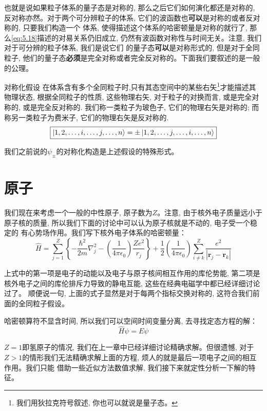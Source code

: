 \documentclass[a4paper,zihao=-4,linespread=1]{ctexrep}
\begin{document}
    也就是说如果粒子体系的量子态是对称的, 那么之后它们如何演化都还是对称的, 反对称亦然。对于两个可分辨粒子的体系, 它们的波函数也\textbf{可以}是对称的或者反对称的, 只要我们构造一个
    体系, 使得描述这个体系的哈密顿量是对称的就行了, 那么\ref{eq:5.18}描述的对易关系仍旧成立, 仍然有波函数对称性与时间无关。注意, 我们对于可分辨的粒子体系, 我们是说它们
    的量子态\textbf{可以}是对称形式的, 但是对于全同粒子, 他们的量子态\textbf{必须}是完全对称或者完全反对称的。下面我们要叙述的是一般的公理。
    \begin{proposition}{对称化假设}
        在体系含有多个全同粒子时,只有其态空间中的某些右矢\footnote{我们用狄拉克符号叙述, 你也可以就说是量子态。}才能描述其物理状态, 根据全同粒子的性质, 这些物理右矢, 对于粒子的对换而言, 或是完全对称的, 或是完全反对称的. 我们称一类粒子为玻色子, 它们的物理右矢是对称的; 而称另一类粒子为费米子, 它们的物理右矢是反对称的.
        \begin{equation}
            \boxed{
                \ket{1,2,\ldots,i,\ldots,j,\ldots,n}=\pm\ket{1,2,\ldots,j,\ldots,i,\ldots,n}
            }
        \end{equation}
    \end{proposition}
    我们之前说的$\psi_\pm$的对称化构造是上述假设的特殊形式。

    \section{原子}
    我们现在来考虑一个一般的中性原子, 原子数为$Z$。注意, 由于核外电子质量远小于原子核的质量, 所以我们下面的讨论中可以认为原子核就是不动的, 电子受一个稳定的
    有心势场作用。我们写下核外电子体系的哈密顿量：
    \begin{equation}
        \hat{H}=\sum_{j=1}^{Z}\left\{-\frac{\hbar^{2}}{2 m} \nabla_{j}^{2}-\left(\frac{1}{4 \pi \epsilon_{0}}\right) \frac{Z e^{2}}{r_{j}}\right\}+\frac{1}{2}\left(\frac{1}{4 \pi \epsilon_{0}}\right) \sum_{i \neq k}^{Z} \frac{e^{2}}{\left|\mathbf{r}_{j}-\mathbf{r}_{k}\right|}
    \end{equation}

    上式中的第一项是电子的动能以及电子与原子核间相互作用的库伦势能, 第二项是核外电子之间的库伦排斥力导致的静电互能, 这些在经典电磁学中都已经详细讨论过了。
    顺便说一句, 上面的式子显然是对于每两个指标交换对称的, 这符合我们前面的全同粒子假设。

    哈密顿算符不显含时间, 所以我们可以空间时间变量分离, 去寻找定态方程的解：
    \[\hat{H}\psi=E\psi\]

    $Z=1$即氢原子的情况, 我们在上一章中已经详细讨论精确求解。但很遗憾, 对于$Z>1$的情形我们无法精确求解上面的方程, 烦人的就是最后一项电子之间的相互作用。我们只能
    借助一些近似方法数值求解, 我们接下来就定性分析一下解的特征。
\end{document}
